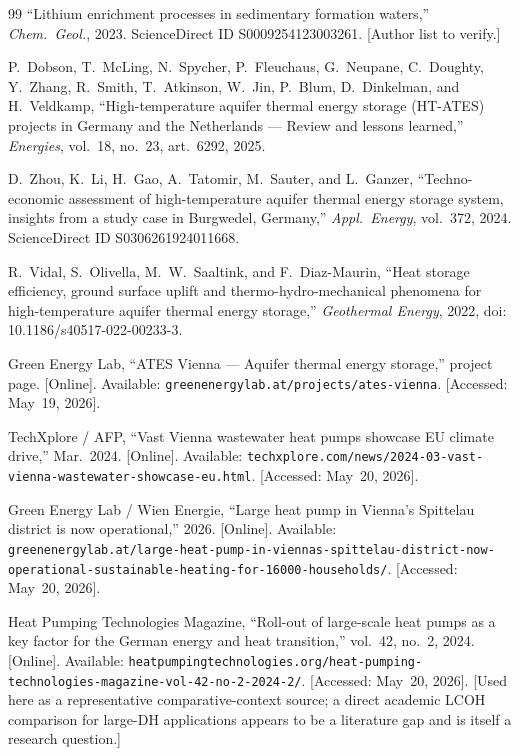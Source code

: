 \documentclass{article}
\begin{document}
\begin{thebibliography}{99}
``Lithium enrichment processes in sedimentary formation waters,'' \emph{Chem.\
Geol.}, 2023. ScienceDirect ID S0009254123003261. [Author list to verify.]

P.~Dobson, T.~McLing, N.~Spycher, P.~Fleuchaus, G.~Neupane, C.~Doughty,
Y.~Zhang, R.~Smith, T.~Atkinson, W.~Jin, P.~Blum, D.~Dinkelman, and
H.~Veldkamp, ``High-temperature aquifer thermal energy storage (HT-ATES)
projects in Germany and the Netherlands --- Review and lessons learned,''
\emph{Energies}, vol.~18, no.~23, art.~6292, 2025.

D.~Zhou, K.~Li, H.~Gao, A.~Tatomir, M.~Sauter, and L.~Ganzer, ``Techno-economic
assessment of high-temperature aquifer thermal energy storage system,
insights from a study case in Burgwedel, Germany,'' \emph{Appl.\ Energy},
vol.~372, 2024. ScienceDirect ID S0306261924011668.

R.~Vidal, S.~Olivella, M.~W.~Saaltink, and F.~Diaz-Maurin, ``Heat storage
efficiency, ground surface uplift and thermo-hydro-mechanical phenomena for
high-temperature aquifer thermal energy storage,'' \emph{Geothermal Energy},
2022, doi: 10.1186/s40517-022-00233-3.

Green Energy Lab, ``ATES Vienna --- Aquifer thermal energy storage,'' project
page. [Online]. Available:
\texttt{greenenergylab.at/projects/ates-vienna}. [Accessed: May~19, 2026].

TechXplore / AFP, ``Vast Vienna wastewater heat pumps showcase EU climate
drive,'' Mar.\ 2024. [Online]. Available:
\texttt{techxplore.com/news/2024-03-vast-vienna-wastewater-showcase-eu.html}.
[Accessed: May~20, 2026].

Green Energy Lab / Wien Energie, ``Large heat pump in Vienna's Spittelau
district is now operational,'' 2026. [Online]. Available:
\texttt{greenenergylab.at/large-heat-pump-in-viennas-spittelau-district-now-operational-sustainable-heating-for-16000-households/}.
[Accessed: May~20, 2026].

Heat Pumping Technologies Magazine, ``Roll-out of large-scale heat pumps as
a key factor for the German energy and heat transition,'' vol.~42, no.~2,
2024. [Online]. Available:
\texttt{heatpumpingtechnologies.org/heat-pumping-technologies-magazine-vol-42-no-2-2024-2/}.
[Accessed: May~20, 2026]. [Used here as a representative comparative-context
source; a direct academic LCOH comparison for large-DH applications appears
to be a literature gap and is itself a research question.]


\end{thebibliography}
\end{document}
